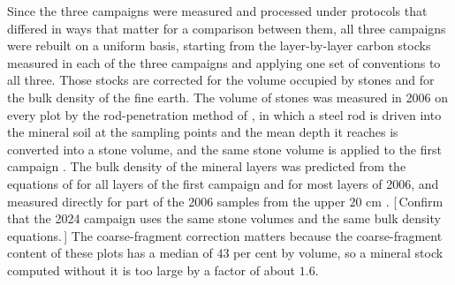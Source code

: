 \documentclass[11pt]{article}
\newcommand{\gap}[1]{\textcolor{red!70!black}{\small[\,#1\,]}}
\begin{document}

Since the three campaigns were measured and processed under protocols
that differed in ways that matter for a comparison between them, all three campaigns
were rebuilt on a uniform basis, starting from the layer-by-layer carbon
stocks measured in each of the three campaigns and applying one set of conventions to
all three. Those stocks are corrected for the volume occupied by stones and for the
bulk density of the fine earth.
The volume of stones was measured in 2006 on every plot by the rod-penetration method
of \citet{Viro1952}, in which a steel rod is driven into the mineral soil at the
sampling points and the mean depth it reaches is converted into a stone volume, and
the same stone volume is applied to the first campaign \citep{Lehtonen2016,Kramarenko}.
The bulk density of the mineral layers was predicted from the equations of
\citet{TamminenStarr1994} for all layers of the first campaign and for most layers of
2006, and measured directly for part of the 2006 samples from the upper $20$ cm
\citep{Kramarenko}. \gap{Confirm that the 2024 campaign uses the same stone volumes
and the same bulk density equations.}
The coarse-fragment correction matters
because the coarse-fragment content of these plots has a median of $43$ per cent by
volume, so a mineral stock computed without it is too large by a factor of about $1.6$.
\end{document}

